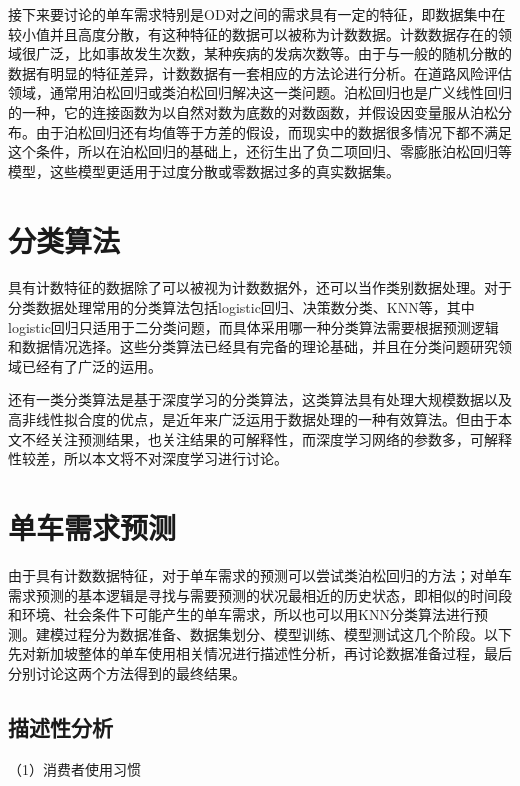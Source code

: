 \documentclass[]{tongjithesis}
\numberwithin{equation}{chapter}
\begin{document}
接下来要讨论的单车需求特别是OD对之间的需求具有一定的特征，即数据集中在较小值并且高度分散，有这种特征的数据可以被称为计数数据。计数数据存在的领域很广泛，比如事故发生次数，某种疾病的发病次数等。由于与一般的随机分散的数据有明显的特征差异，计数数据有一套相应的方法论进行分析。在道路风险评估领域，通常用泊松回归或类泊松回归解决这一类问题\cite{mannering2014analytic}。泊松回归也是广义线性回归的一种，它的连接函数为以自然对数为底数的对数函数，并假设因变量服从泊松分布。由于泊松回归还有均值等于方差的假设，而现实中的数据很多情况下都不满足这个条件，所以在泊松回归的基础上，还衍生出了负二项回归、零膨胀泊松回归等模型，这些模型更适用于过度分散或零数据过多的真实数据集。

\section{分类算法}
具有计数特征的数据除了可以被视为计数数据外，还可以当作类别数据处理\cite{lukusa2020horvitz}。对于分类数据处理常用的分类算法包括logistic回归、决策数分类、KNN等，其中logistic回归只适用于二分类问题，而具体采用哪一种分类算法需要根据预测逻辑和数据情况选择。这些分类算法已经具有完备的理论基础，并且在分类问题研究领域已经有了广泛的运用。

还有一类分类算法是基于深度学习的分类算法，这类算法具有处理大规模数据以及高非线性拟合度的优点，是近年来广泛运用于数据处理的一种有效算法。但由于本文不经关注预测结果，也关注结果的可解释性，而深度学习网络的参数多，可解释性较差，所以本文将不对深度学习进行讨论。

\section{单车需求预测}
由于具有计数数据特征，对于单车需求的预测可以尝试类泊松回归的方法；对单车需求预测的基本逻辑是寻找与需要预测的状况最相近的历史状态，即相似的时间段和环境、社会条件下可能产生的单车需求，所以也可以用KNN分类算法进行预测。建模过程分为数据准备、数据集划分、模型训练、模型测试这几个阶段。以下先对新加坡整体的单车使用相关情况进行描述性分析，再讨论数据准备过程，最后分别讨论这两个方法得到的最终结果。

\subsection{描述性分析}
（1）消费者使用习惯
\end{document}
